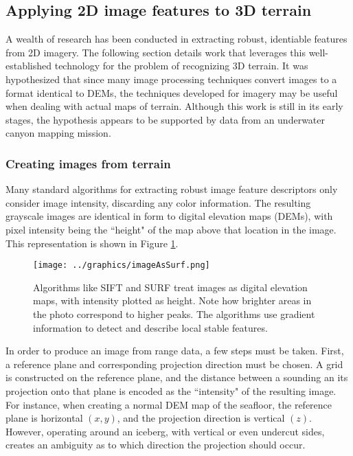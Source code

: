 \subsection{Applying 2D image features to 3D terrain}

A wealth of research has been conducted in extracting robust, identiable features from 2D imagery. The following section details work that leverages this well-established technology for the problem of recognizing 3D terrain. It was hypothesized that since many image processing techniques convert images to a format identical to DEMs, the techniques developed for imagery may be useful when dealing with actual maps of terrain. Although this work is still in its early stages, the hypothesis appears to be supported by data from an underwater canyon mapping mission.

\subsubsection{Creating images from terrain}

Many standard algorithms for extracting robust image feature descriptors only consider image intensity, discarding any color information. The resulting grayscale images are identical in form to digital elevation maps (DEMs), with pixel intensity being the ``height" of the map above that location in the image. This representation is shown in Figure \ref{fig:imAsSurf}. 

\begin{figure}[htb]
   \centering
   \texttt{[image: ../graphics/imageAsSurf.png]} %
   \caption{Algorithms like SIFT and SURF treat images as digital elevation maps, with intensity plotted as height. Note how brighter areas in the photo correspond to higher peaks. The algorithms use gradient information to detect and describe local stable features.}
   \label{fig:imAsSurf}
\end{figure}

In order to produce an image from range data, a few steps must be taken. First, a reference plane and corresponding projection direction must be chosen. A grid is constructed on the reference plane, and the distance between a sounding an its projection onto that plane is encoded as the ``intensity" of the resulting image. For instance, when creating a normal DEM map of the seafloor, the reference plane is horizontal $(x,y)$, and the projection direction is vertical $(z)$. However, operating around an iceberg, with vertical or even undercut sides, creates an ambiguity as to which direction the projection should occur. 

